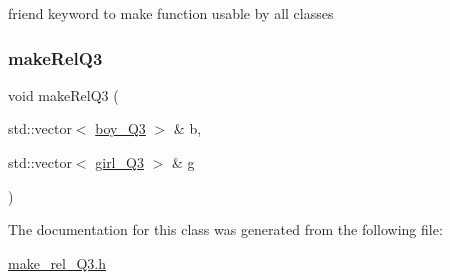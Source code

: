 friend keyword to make function usable by all classes 

\mbox{\label{classmake__rel___q3_a209f34f3ac506a757a78c54e6c0e300a}} 
\subsubsection{\texorpdfstring{make\+Rel\+Q3}{makeRelQ3}\hspace{0.1cm}{\footnotesize\ttfamily [2/2]}}
{\footnotesize\ttfamily void make\+Rel\+Q3 (\begin{DoxyParamCaption}\item[{std\+::vector$<$ \hyperlink{classboy___q3}{boy\+\_\+\+Q3} $>$ \&}]{b,  }\item[{std\+::vector$<$ \hyperlink{classgirl___q3}{girl\+\_\+\+Q3} $>$ \&}]{g }\end{DoxyParamCaption})\hspace{0.3cm}{\ttfamily [friend]}}



The documentation for this class was generated from the following file\+:\begin{DoxyCompactItemize}
\item 
\hyperlink{make__rel___q3_8h}{make\+\_\+rel\+\_\+\+Q3.\+h}\end{DoxyCompactItemize}
